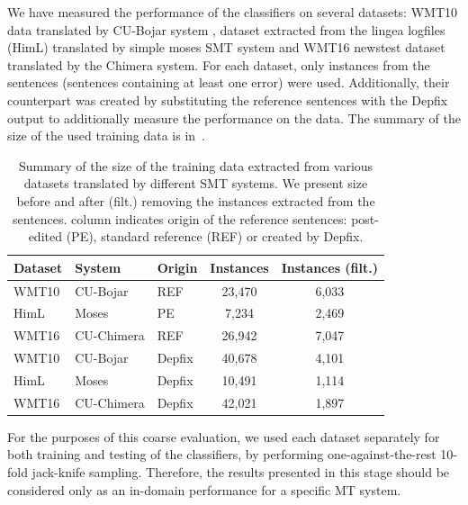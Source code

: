 We have measured the performance of the classifiers on several datasets:
WMT10 data translated by CU-Bojar system \citep{biblio:BoJaProbesin2012},
dataset extracted from the lingea logfiles (HimL) translated by simple moses SMT system \citep{Koehn:2007:MOS:1557769.1557821} and
WMT16 newstest dataset translated by the Chimera system.
For each dataset, only instances from the  sentences (sentences containing at least one error)
were used.
Additionally, their counterpart was
created by substituting the reference sentences with the Depfix output
to additionally measure the performance on the  data.
The summary of the size of the used training data is in~.

\begin{table}[t]
\centering
\small

\begin{tabular}{lll|cc}
Dataset  &  System  & Origin  &  \hash{} Instances  &  \hash{} Instances (filt.)  \\
\hline
WMT10  &  CU-Bojar  &  REF  &  23,470  &  6,033  \\
HimL  &  Moses  &  PE  & 7,234  &  2,469  \\
WMT16  &  CU-Chimera  &  REF  &  26,942  &  7,047  \\
WMT10  &  CU-Bojar  &  Depfix  &  40,678  &  4,101  \\
HimL  &  Moses  &  Depfix  &  10,491  &  1,114  \\
WMT16  &  CU-Chimera  &  Depfix  &  42,021  &  1,897  \\
\end{tabular}
\caption[Summary of the extracted Czech training data for error detection]{
    Summary of the size of the training data extracted from various datasets translated by different SMT systems. We present
size before and after (filt.) removing the instances extracted from the  sentences.
 column indicates origin
of the reference sentences: post-edited (PE), standard reference (REF) or created by Depfix.
}
\label{wf-training-sum}
\end{table}


For the purposes of this coarse evaluation, we used each dataset separately for both training
and testing of the classifiers, by performing one-against-the-rest 10-fold jack-knife sampling.
Therefore, the results presented in this stage should be considered only as an in-domain
performance for a specific MT system.

